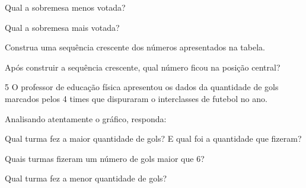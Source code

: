 \begin{escolha}
\item
  Qual a sobremesa menos votada?


\item
  Qual a sobremesa mais votada?


\item
  Construa uma sequência crescente dos números apresentados na tabela.


\item
  Após construir a sequência crescente, qual número ficou na posição
  central?

\end{escolha}


\num{5} O professor de educação física apresentou os dados da quantidade de
gols marcados pelos 4 times que dispuraram o interclasses de futebol no
ano.


Analisando atentamente o gráfico, responda:

\begin{escolha}
\item
  Qual turma fez a maior quantidade de gols? E qual foi a quantidade que
  fizeram?


\item
  Quais turmas fizeram um número de gols maior que 6?


\item
  Qual turma fez a menor quantidade de gols?

\end{escolha}



